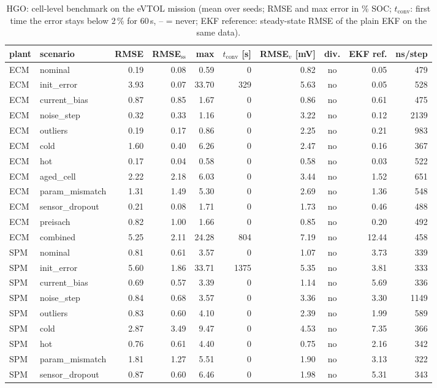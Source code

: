 \begin{table}[H]\centering\footnotesize\setlength{\tabcolsep}{4pt}
\caption{HGO: cell-level benchmark on the eVTOL mission (mean over seeds; RMSE and max error in \% SOC; $t_\mathrm{conv}$: first time the error stays below 2\,\% for 60\,s, -- = never; EKF reference: steady-state RMSE of the plain EKF on the same data).}\label{tab:cell_HGO}
\begin{tabular}{llrrrrrcrr}\toprule
plant & scenario & RMSE & RMSE$_\mathrm{ss}$ & max & $t_\mathrm{conv}$ [s] & RMSE$_v$ [mV] & div. & EKF ref. & ns/step \\ \midrule
ECM & nominal & 0.19 & 0.08 & 0.59 & 0 & 0.82 & no & 0.05 & 479 \\
ECM & init\_error & 3.93 & 0.07 & 33.70 & 329 & 5.63 & no & 0.05 & 528 \\
ECM & current\_bias & 0.87 & 0.85 & 1.67 & 0 & 0.86 & no & 0.61 & 475 \\
ECM & noise\_step & 0.32 & 0.33 & 1.16 & 0 & 3.22 & no & 0.12 & 2139 \\
ECM & outliers & 0.19 & 0.17 & 0.86 & 0 & 2.25 & no & 0.21 & 983 \\
ECM & cold & 1.60 & 0.40 & 6.26 & 0 & 2.47 & no & 0.16 & 367 \\
ECM & hot & 0.17 & 0.04 & 0.58 & 0 & 0.58 & no & 0.03 & 522 \\
ECM & aged\_cell & 2.22 & 2.18 & 6.03 & 0 & 3.44 & no & 1.52 & 651 \\
ECM & param\_mismatch & 1.31 & 1.49 & 5.30 & 0 & 2.69 & no & 1.36 & 548 \\
ECM & sensor\_dropout & 0.21 & 0.08 & 1.71 & 0 & 1.73 & no & 0.46 & 488 \\
ECM & preisach & 0.82 & 1.00 & 1.66 & 0 & 0.85 & no & 0.20 & 492 \\
ECM & combined & 5.25 & 2.11 & 24.28 & 804 & 7.19 & no & 12.44 & 458 \\
\midrule
SPM & nominal & 0.81 & 0.61 & 3.57 & 0 & 1.07 & no & 3.73 & 339 \\
SPM & init\_error & 5.60 & 1.86 & 33.71 & 1375 & 5.35 & no & 3.81 & 333 \\
SPM & current\_bias & 0.69 & 0.57 & 3.39 & 0 & 1.14 & no & 5.69 & 336 \\
SPM & noise\_step & 0.84 & 0.68 & 3.57 & 0 & 3.36 & no & 3.30 & 1149 \\
SPM & outliers & 0.83 & 0.60 & 4.10 & 0 & 2.39 & no & 1.99 & 589 \\
SPM & cold & 2.87 & 3.49 & 9.47 & 0 & 4.53 & no & 7.35 & 366 \\
SPM & hot & 0.76 & 0.61 & 4.40 & 0 & 0.75 & no & 2.16 & 342 \\
SPM & param\_mismatch & 1.81 & 1.27 & 5.51 & 0 & 1.90 & no & 3.13 & 322 \\
SPM & sensor\_dropout & 0.87 & 0.60 & 6.46 & 0 & 1.98 & no & 5.31 & 343 \\
\bottomrule\end{tabular}\end{table}
